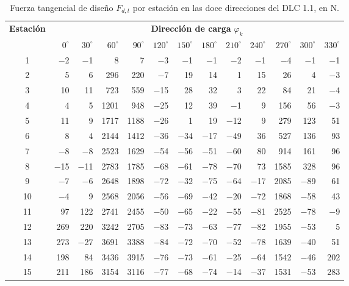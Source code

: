 \begin{table}[H]
    \centering
    \footnotesize
    \setlength{\tabcolsep}{3.2pt}
    \caption{Fuerza tangencial de diseño $F_{d,t}$ por estación en las doce direcciones del DLC 1.1, en N.}
    \label{tab:anexo_dir_dlc11_t}
    \begin{tabular}{crrrrrrrrrrrr}
        \hline
        \textbf{Estación} & \multicolumn{12}{c}{\textbf{Dirección de carga} $\varphi_k$} \\
        \cline{2-13}
        & $0^\circ$ & $30^\circ$ & $60^\circ$ & $90^\circ$ & $120^\circ$ & $150^\circ$ & $180^\circ$ & $210^\circ$ & $240^\circ$ & $270^\circ$ & $300^\circ$ & $330^\circ$ \\
        \hline
        1 & $-$2 & $-$1 & 8 & 7 & $-$3 & $-$1 & $-$1 & $-$2 & $-$1 & $-$4 & $-$1 & $-$1 \\
        2 & 5 & 6 & 296 & 220 & $-$7 & 19 & 14 & 1 & 15 & 26 & 4 & $-$3 \\
        3 & 10 & 11 & 723 & 559 & $-$15 & 28 & 32 & 3 & 22 & 84 & 21 & $-$4 \\
        4 & 4 & 5 & 1201 & 948 & $-$25 & 12 & 39 & $-$1 & 9 & 156 & 56 & $-$3 \\
        5 & 11 & 9 & 1717 & 1188 & $-$26 & 1 & 19 & $-$12 & 9 & 279 & 123 & 51 \\
        6 & 8 & 4 & 2144 & 1412 & $-$36 & $-$34 & $-$17 & $-$49 & 36 & 527 & 136 & 93 \\
        7 & $-$8 & $-$8 & 2523 & 1629 & $-$54 & $-$56 & $-$51 & $-$60 & 80 & 914 & 161 & 96 \\
        8 & $-$15 & $-$11 & 2783 & 1785 & $-$68 & $-$61 & $-$78 & $-$70 & 73 & 1585 & 328 & 96 \\
        9 & $-$7 & $-$6 & 2648 & 1898 & $-$72 & $-$32 & $-$75 & $-$64 & $-$17 & 2085 & $-$89 & 61 \\
        10 & $-$4 & 9 & 2568 & 2056 & $-$56 & $-$69 & $-$42 & $-$20 & $-$72 & 1868 & $-$58 & 43 \\
        11 & 97 & 122 & 2741 & 2455 & $-$50 & $-$65 & $-$22 & $-$55 & $-$81 & 2525 & $-$78 & $-$9 \\
        12 & 269 & 220 & 3242 & 2705 & $-$83 & $-$73 & $-$63 & $-$77 & $-$82 & 1955 & $-$53 & 5 \\
        13 & 273 & $-$27 & 3691 & 3388 & $-$84 & $-$72 & $-$70 & $-$52 & $-$78 & 1639 & $-$40 & 51 \\
        14 & 198 & 84 & 3436 & 3915 & $-$76 & $-$73 & $-$61 & $-$25 & $-$64 & 1542 & $-$46 & 202 \\
        15 & 211 & 186 & 3154 & 3116 & $-$77 & $-$68 & $-$74 & $-$14 & $-$37 & 1531 & $-$53 & 283 \\

\end{tabular}
\end{table}
